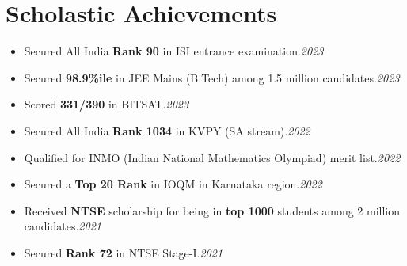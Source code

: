 \documentclass[letterpaper,11pt]{article}
\newcommand{\resumeItem}[1]{
  \item\small{
    {#1 \vspace{-2pt}}
  }
}
\newcommand{\resumeSubItem}[1]{\resumeItem{#1}\vspace{-4pt}}
\newcommand{\resumeSubHeadingListStart}{\begin{itemize}[leftmargin=0.0in, label={}]}
\newcommand{\resumeSubHeadingListEnd}{\end{itemize}}
\begin{document}
\section{Scholastic Achievements}
  \resumeSubHeadingListStart
  \resumeSubItem{Secured All India \textbf{Rank 90} in ISI entrance examination.\hfill \textit{2023}}
  
  \resumeSubItem{Secured \textbf{98.9\%ile} in JEE Mains (B.Tech) among 1.5 million candidates.\hfill \textit{2023}}

  \resumeSubItem{Scored \textbf{331/390} in BITSAT.\hfill \textit{2023}}

  \resumeSubItem{Secured All India \textbf{Rank 1034} in KVPY (SA stream).\hfill \textit{2022}}
  
  \resumeSubItem{Qualified for INMO (Indian National Mathematics Olympiad) merit list.\hfill \textit{2022}}
  
  \resumeSubItem{Secured a \textbf{Top 20 Rank} in IOQM in Karnataka region.\hfill \textit{2022}}
  
  \resumeSubItem{Received \textbf{NTSE} scholarship for being in \textbf{top 1000} students among 2 million candidates.\hfill \textit{2021}} 

  \resumeSubItem{Secured \textbf{Rank 72} in NTSE Stage-I.\hfill \textit{2021}}
  
  \resumeSubHeadingListEnd
\end{document}
